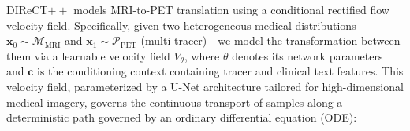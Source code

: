 DIReCT$++$ models MRI-to-PET translation using a conditional rectified flow velocity field. Specifically, given two heterogeneous medical distributions---$\mathbf{x}_0 \sim \mathcal{M}_{\text{MRI}}$ and $\mathbf{x}_1 \sim \mathcal{P}_{\text{PET}}$ (multi-tracer)---we model the transformation between them via a learnable velocity field $V_\theta$, where $\theta$ denotes its network parameters and $\mathbf{c}$ is the conditioning context containing tracer and clinical text features. This velocity field, parameterized by a U-Net architecture tailored for high-dimensional medical imagery, governs the continuous transport of samples along a deterministic path governed by an ordinary differential equation (ODE):
